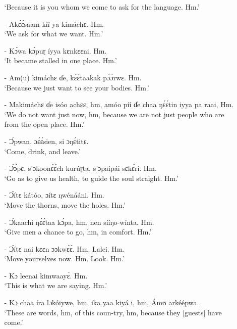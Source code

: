 \documentclass[output=paper,colorlinks,citecolor=brown]{langscibook}
\begin{document}
\begin{enumerate}
\begin{enumerate}
                `Because it is you whom we come to ask for the language. Hm.'
    \item[-]     Akɛ́ɛ́saam kíí ya kimáchɛ. Hm.\\
                `We ask for what we want. Hm.'
    \item[-]     Kɔ́wa kɔ́puɽ íyya kɛnkɛɛni. Hm.\\
                `It became stalled in one place. Hm.'
    \item[-]     Am(u) kimáchɛ ɗe, kɛ́ɛ́taakak pɔ́ɔ́rwɛ. Hm.\\
                `Because we just want to see your bodies. Hm.'
    \item[-]     Makimáchɛ ɗe isóo achɛɛ, hm, amóo píí ɗe chaa ŋɛ́ɛ́tin iyya pa raai, Hm.\\
                `We do not want just now, hm, because we are not just people who are from the open place. Hm.'
    \item[-]     Ɔ́pwan, ɔɛ́ɛ́sien, si ɔŋɛ́titɛ.\\
                `Come, drink, and leave.'
    \item[-]     Ɔ́ɔ́pɛ, s’ɔkoonɛ́ɛ́ch kurúɽta, s’ɔpaipái sɛkɛ́rí. Hm.\\
                `Go as to give us health, to guide the soul straight. Hm.'
    \item[-]     Ɔ́ítɛ kátóo, ɔítɛ ŋwénááni. Hm.\\
                `Move the thorns, move the holes. Hm.'
    \item[-]     Ɔ́kaachi ŋɛ́ɛ́taa kɔ́pa, hm, nen sííŋo-wínta. Hm.\\
                `Give men a chance to go, hm, in comfort. Hm.'
    \item[-]     Ɔ́ítɛ nai kɛɛn ɔɔkwɛ́ɛ́. Hm. Lalei. Hm.\\
                `Move yourselves now. Hm. Look. Hm.'
    \item[-]     Kɔ leenai kimwaayɛ́. Hm.\\
                `This is what we are saying. Hm.'
    \item[-]     Kɔ chaa íra lɔkóiywe, hm, ika yaa kiyá i, hm, Ámʊ arkéépwa.\\
                `These are words, hm, of this coun-try, hm, because they [guests] have come.'
    \end{enumerate}
\end{enumerate}
\end{document}
